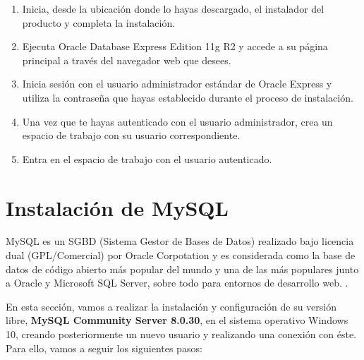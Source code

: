 \begin{itemize}
\begin{enumerate}
\begin{itemize}
        \end{itemize}
    \item Inicia, desde la ubicación donde lo hayas descargado, el instalador del producto y completa la instalación.
    \item Ejecuta Oracle Database Express Edition 11g R2 y accede a su página principal a través del navegador web que desees.
    \item Inicia sesión con el usuario administrador estándar de Oracle Express y utiliza la contraseña que hayas establecido durante el proceso de instalación.
    \item Una vez que te hayas autenticado con el usuario administrador, crea un espacio de trabajo con su usuario correspondiente.
    \item Entra en el espacio de trabajo con el usuario autenticado.
    \end{enumerate}
\end{itemize}

\section{Instalación de MySQL}
MySQL es un SGBD (Sistema Gestor de Bases de Datos) realizado bajo licencia dual (GPL/Comercial) por Oracle Corpotation y es considerada como la base de datos de código abierto más popular del mundo y una de las más populares junto a Oracle y Microsoft SQL Server, sobre todo para entornos de desarrollo web. \cite{mysql}.

En esta sección, vamos a realizar la instalación y configuración de su versión libre, \textbf{MySQL Community Server 8.0.30}, en el sistema operativo Windows 10, creando posteriormente un nuevo usuario y realizando una conexión con éste. Para ello, vamos a seguir los siguientes pasos:

